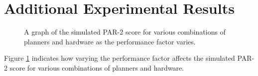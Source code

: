 \section{Additional Experimental Results}

\begin{figure}[t]
\begin{center}

\caption{\label{fig:performance-factor} A graph of the simulated PAR-2 score for various combinations of planners and hardware as the performance factor varies.}
\end{center}
\end{figure}

Figure \ref{fig:performance-factor} indicates how varying the performance factor affects the simulated PAR-2 score for various combinations of planners and hardware. 
